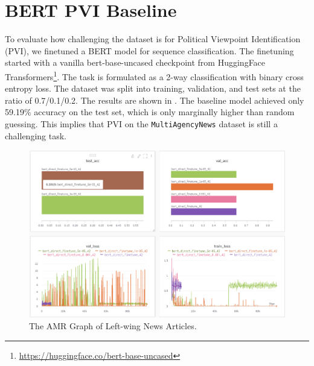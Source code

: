 \clearpage

\section{BERT PVI Baseline}
\label{empirical-bert-pvi}
To evaluate how challenging the dataset is for Political Viewpoint Identification (PVI), we finetuned a BERT model for sequence classification. The finetuning started with a vanilla bert-base-uncased checkpoint from HuggingFace Transformers\footnote{\url{https://huggingface.co/bert-base-uncased}}. The task is formulated as a 2-way classification with binary cross entropy loss. The dataset was split into training, validation, and test sets at the ratio of 0.7/0.1/0.2. The results are shown in . The baseline model achieved only 59.19\% accuracy on the test set, which is only marginally higher than random guessing. This implies that PVI on the \texttt{MultiAgencyNews} dataset is still a challenging task.

\begin{figure}[ht]
    \centering
    \includegraphics[width=\textwidth]{img/empirical-bert-baseline}
    \caption{The AMR Graph of Left-wing News Articles.}
    \label{fig:empirical-bert-baseline}
\end{figure}
